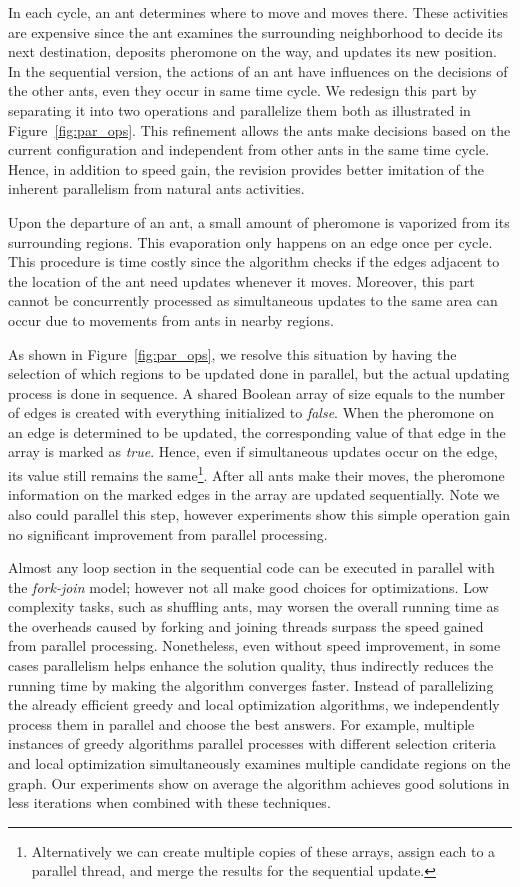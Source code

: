 \documentclass[11pt]{article}
\begin{document}
In each cycle, an ant determines where to move and moves there.  These activities are expensive since the ant examines the surrounding neighborhood to decide its next destination, deposits pheromone on the way, and updates its new position.  In the sequential version, the actions of an ant have influences on the decisions of the other ants, even they occur in same time cycle. We redesign this part by separating it into two operations and parallelize them both as illustrated in Figure~\ref{fig:par_ops}.  This refinement allows the ants make decisions based on the current configuration and independent from other ants in the same time cycle.  Hence, in addition to speed gain, the revision provides better imitation of the inherent parallelism from natural ants activities.

Upon the departure of an ant, a small amount of pheromone is vaporized from its surrounding regions. This evaporation only happens on an edge once per cycle. This procedure is time costly since the algorithm checks if the edges adjacent to the location of the ant need updates whenever it moves. Moreover, this part cannot be concurrently processed as simultaneous updates to the same area can occur due to movements from ants in nearby regions.

As shown in Figure~\ref{fig:par_ops}, we resolve this situation by having the selection of which regions to be updated done in parallel, but the actual updating process is done in sequence.  A shared Boolean array of size equals to the number of edges is created with everything initialized to \textit{false}.  When the pheromone on an edge is determined to be updated, the corresponding value of that edge in the array is marked as \textit{true}.  Hence, even if simultaneous updates occur on the edge, its value still remains the same\footnote{Alternatively we can create multiple copies of these arrays, assign each to a parallel thread, and merge the results for the sequential update.}. After all ants make their moves, the pheromone information on the marked edges in the array are updated sequentially.  Note we also could parallel this step, however experiments show this simple operation gain no significant improvement from parallel processing.

Almost any loop section in the sequential code can be executed in parallel with the \textit{fork-join} model; however not all make good choices for optimizations.  Low complexity tasks, such as shuffling ants, may worsen the overall running time as the overheads caused by forking and joining threads surpass the speed gained from parallel processing.  Nonetheless, even without speed improvement, in some cases parallelism helps enhance the solution quality, thus indirectly reduces the running time by making the algorithm converges faster. Instead of parallelizing the already efficient greedy and local optimization algorithms, we independently process them in parallel and choose the best answers.  For example, multiple instances of greedy algorithms parallel processes with different selection criteria and local optimization simultaneously examines multiple candidate regions on the graph. Our experiments show on average the algorithm achieves good solutions in less iterations when combined with these techniques.
\end{document}
